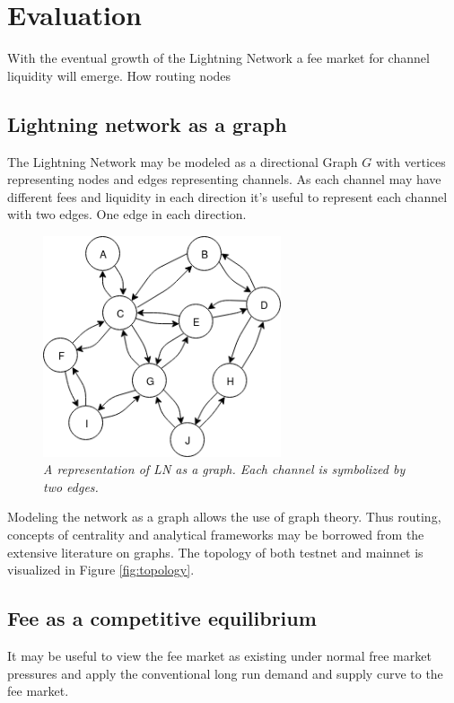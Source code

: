 \chapter{Evaluation}

With the eventual growth of the Lightning Network a fee market for channel liquidity will emerge. How routing nodes 

\section{Lightning network as a graph}

The Lightning Network may be modeled as a directional Graph $G$ with vertices representing nodes and edges representing channels. As each channel may have different fees and liquidity in each direction it's useful to represent each channel with two edges. One edge in each direction. 

\begin{figure}[!htb]
	\hspace*{-0.7cm} 
	\centering
	\includegraphics[width=7cm]{images/LN_overview.png}
	\caption{ \textit{A representation of LN as a graph. Each channel is symbolized by two edges.} 
	}
	\label{fig:ln:graph}
	\hspace*{2mm}
\end{figure}

Modeling the network as a graph allows the use of graph theory. Thus routing, concepts of centrality and analytical frameworks may be borrowed from the extensive literature on graphs. The topology of both testnet and mainnet is visualized in Figure \ref{fig:topology}.

\section{Fee as a competitive equilibrium}

It may be useful to view the fee market as existing under normal free market pressures and apply the conventional long run demand and supply curve\cite{boulding:evolutionary:economy} to the fee market. 

